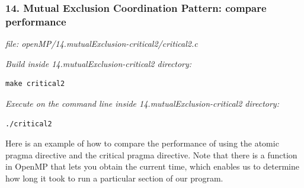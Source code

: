 \documentclass[letterpaper,10pt,openany,oneside]{sphinxmanual}
\begin{document}
\subsubsection{14.  Mutual Exclusion Coordination Pattern: compare performance}
\label{SharedMemory/MutualExclusion:mutual-exclusion-coordination-pattern-compare-performance}
\emph{file: openMP/14.mutualExclusion-critical2/critical2.c}

\emph{Build inside 14.mutualExclusion-critical2 directory:}

\begin{Verbatim}[commandchars=\\\{\}]
make critical2
\end{Verbatim}

\emph{Execute on the command line inside 14.mutualExclusion-critical2 directory:}

\begin{Verbatim}[commandchars=\\\{\}]
./critical2
\end{Verbatim}

Here is an example of how to compare the performance of using the atomic pragma directive and the critical pragma directive.  Note that there is a function in OpenMP that lets you obtain the current time, which enables us to determine how long it took to run a particular section of our program.
\end{document}
